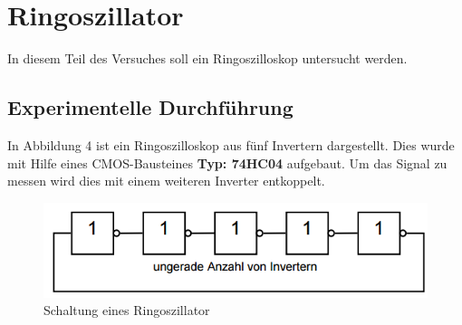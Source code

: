 \section{Ringoszillator}
In diesem Teil des Versuches soll ein Ringoszilloskop untersucht werden.
\subsection{Experimentelle Durchf\"uhrung}
In Abbildung 4 ist ein Ringoszilloskop aus f\"unf Invertern dargestellt. Dies wurde mit Hilfe eines CMOS-Bausteines \textbf{Typ: 74HC04} aufgebaut. Um das Signal zu messen wird dies mit einem weiteren Inverter entkoppelt.
\begin{figure}[!h]
\begin{center}
\includegraphics[scale=0.5]{bild/Ringoszillator}
\caption{Schaltung eines Ringoszillator}
\end{center}
\end{figure} 
